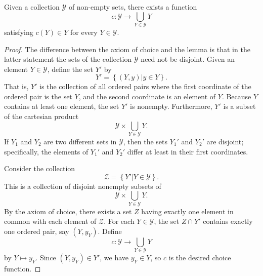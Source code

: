 \begin{lemma}
Given a collection $\mathcal{Y}$ of non-empty sets, there exists a function
\begin{equation*}
c: \mathcal{Y}  \rightarrow \bigcup_{Y \in \mathcal{Y}} Y
\end{equation*}
satisfying $c(Y) \in Y$ for every $Y \in \mathcal{Y}$.
\end{lemma}
\begin{proof}
The difference between the axiom of choice and the lemma is that in the latter statement the sets of the collection $\mathcal{Y}$ need not be disjoint.
Given an element $Y \in \mathcal{Y}$, define the set $Y'$ by
\begin{equation*}
Y' = \left\{ \left( Y, y \right) | y \in Y \right\}.
\end{equation*}
That is, $Y'$ is the collection of all ordered pairs where the first coordinate of the ordered pair is the set $Y$, and the second coordinate is an element of $Y$.
Because $Y$ contains at least one element, the set $Y'$ is nonempty.
Furthermore, $Y'$ is a subset of the cartesian product
\begin{equation*}
\mathcal{Y} \times \bigcup_{Y \in \mathcal{Y}} Y.
\end{equation*}
If $Y_1$ and $Y_2$ are two different sets in $\mathcal{Y}$, then the sets $Y_1'$ and $Y_2'$ are disjoint; specifically, the elements of $Y_1'$ and $Y_2'$ differ at least in their first coordinates.

Consider the collection
\begin{equation*}
\mathcal{Z} = \left\{ Y' | Y \in \mathcal{Y} \right\}.
\end{equation*}
This is a collection of disjoint nonempty subsets of
\begin{equation*}
\mathcal{Y} \times \bigcup_{Y \in \mathcal{Y}} Y.
\end{equation*}
By the axiom of choice, there exists a set $Z$ having exactly one element in common with each element of $\mathcal{Z}$.
For each $Y\in\mathcal Y$, the set $Z\cap Y'$ contains exactly one ordered pair, say $(Y,y_Y)$.
Define \[ c:\mathcal Y\to\bigcup_{Y\in\mathcal Y}Y\] by $Y \mapsto y_Y$.
Since $(Y,y_Y)\in Y'$, we have $y_Y\in Y$, so $c$ is the desired choice function.
\end{proof}


